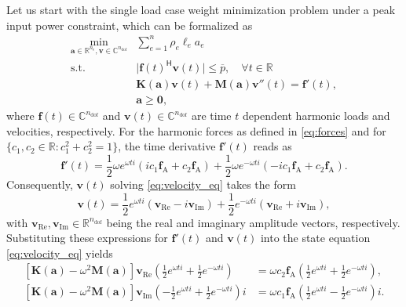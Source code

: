 \documentclass[preprint,3p]{elsarticle}
\newcommand{\TC}{^{\mathsf H}}
\newcommand{\nel}{n_\mathrm{e}}
\newcommand{\ndof}{n_\mathrm{dof}}
\newcommand{\A}{\mathrm{A}}
\newcommand{\Real}{\mathrm{Re}}
\newcommand{\I}{\mathrm{Im}}
\numberwithin{equation}{section}
\begin{document}
Let us start with the single load case weight minimization problem under a peak input power constraint, which can be formalized as
%
\begin{subequations}\label{eq:peakpoweropt}
  \begin{align}
    \min_{\mathbf{a}\in \mathbb{R}^{\nel}, \mathbf{v} \in \mathbb{C}^{\ndof}} & \sum_{e=1}^{n} \rho_e \ell_e a_e\\
    \mathrm{s.t.}\; & \lvert \mathbf{f}(t)\TC \mathbf{v}(t) \rvert \le \overline{p}, \quad\forall t\in \mathbb{R}\label{eq:peakpower_abs}\\
    & \mathbf{K}(\mathbf{a})\mathbf{v}(t) + \mathbf{M}(\mathbf{a})\mathbf{v}''(t) = \mathbf{f}'(t),\label{eq:velocity_eq}\\
    & \mathbf{a}\ge \mathbf{0},
  \end{align}
\end{subequations}
%
where $\mathbf{f}(t) \in \mathbb{C}^{\ndof}$ and $\mathbf{v}(t) \in \mathbb{C}^{\ndof}$ are time $t$ dependent harmonic loads and velocities, respectively. For the harmonic forces as defined in \eqref{eq:forces} and for $\{c_1,c_2 \in \mathbb{R}: c_1^2+c_2^2 = 1\}$, the time derivative $\mathbf{f}'(t)$ reads as
%
\begin{equation}
  \mathbf{f}'(t) = \frac{1}{2} \omega e^{\omega t i}(i c_1 \mathbf{f}_\A + c_2 \mathbf{f}_\A) + \frac{1}{2}\omega e^{-\omega t i}( - i c_1 \mathbf{f}_\A + c_2 \mathbf{f}_\A).
\end{equation}
%
Consequently, $\mathbf{v}(t)$ solving \eqref{eq:velocity_eq} takes the form
%
\begin{equation}
  \mathbf{v}(t) = \frac{1}{2} e^{\omega t i}(\mathbf{v}_\Real - i \mathbf{v}_\I) + \frac{1}{2} e^{-\omega t i}( \mathbf{v}_\Real + i \mathbf{v}_\I),
\end{equation}
%
with $\mathbf{v}_\Real, \mathbf{v}_\I \in \mathbb{R}^{\ndof}$ being the real and imaginary amplitude vectors, respectively. Substituting these expressions for $\mathbf{f}'(t)$ and $\mathbf{v}(t)$ into the state equation \eqref{eq:velocity_eq} yields
%
\begin{subequations}
  \begin{align}
    \left[\mathbf{K}(\mathbf{a}) - \omega^2 \mathbf{M}(\mathbf{a})\right]\mathbf{v}_\Real \left( \frac{1}{2} e^{\omega t i} + \frac{1}{2} e^{-\omega t i}  \right) &=\omega c_2 \mathbf{f}_\A \left( \frac{1}{2} e^{\omega t i} + \frac{1}{2} e^{-\omega t i}  \right),\\
    \left[\mathbf{K}(\mathbf{a}) - \omega^2 \mathbf{M}(\mathbf{a})\right] \mathbf{v}_\I \left( -\frac{1}{2} e^{\omega t i} + \frac{1}{2} e^{-\omega t i}  \right)i &= \omega c_1 \mathbf{f}_\A \left( \frac{1}{2} e^{\omega t i} - \frac{1}{2} e^{-\omega t i}  \right)i.
  \end{align}
\end{subequations}
\end{document}
